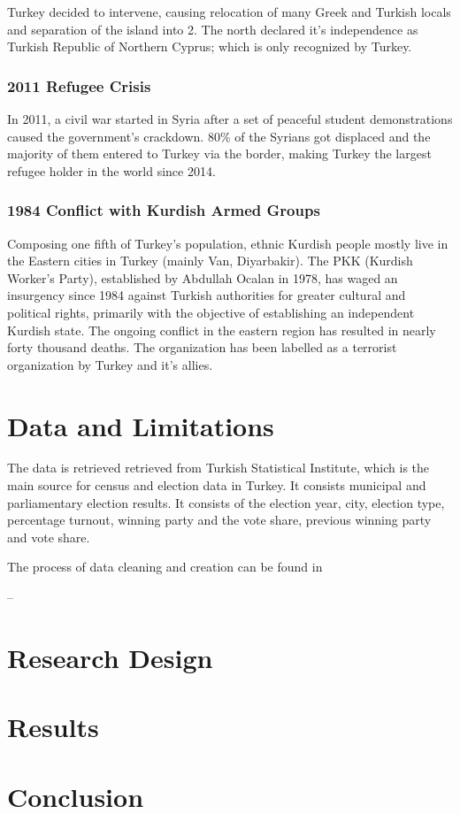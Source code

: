 \documentclass[12pt]{article}
\begin{document}
Turkey decided to intervene, causing relocation of many Greek and Turkish locals and separation of the island into 2. The north declared it's independence as Turkish Republic of Northern Cyprus; which is only recognized by Turkey. 

\subsubsection{2011 Refugee Crisis}

In 2011, a civil war started in Syria after a set of peaceful student demonstrations caused the government's crackdown. 80\% of the Syrians got displaced and the majority of them entered to Turkey via the border, making Turkey the largest refugee holder in the world since 2014. 

\subsubsection{1984 Conflict with Kurdish Armed Groups}

Composing one fifth of Turkey's population, ethnic Kurdish people mostly live in the Eastern cities in Turkey (mainly Van, Diyarbakir). The PKK (Kurdish Worker's Party), established by Abdullah Ocalan in 1978, has waged an insurgency since 1984 against Turkish authorities for greater cultural and political rights, primarily with the objective of establishing an independent Kurdish state. The ongoing conflict in the eastern region has resulted in nearly forty thousand deaths. The organization has been labelled as a terrorist organization by Turkey and it's allies. 


\section{Data and Limitations}

The data is retrieved retrieved from Turkish Statistical Institute, which is the main source for census and election data in Turkey. It consists municipal and parliamentary election results. It consists of the election year, city, election type, percentage turnout, winning party and the vote share, previous winning party and vote share. 

The process of data cleaning and creation can be found in 

--

\section{Research Design}



\section{Results}



\section{Conclusion}
\end{document}
